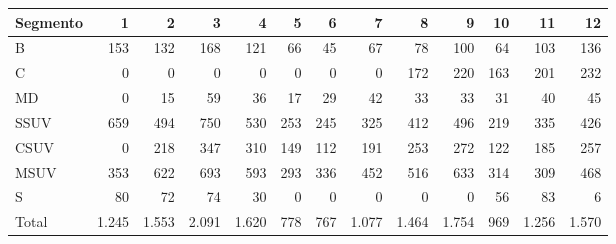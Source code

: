 \begin{tabular}{lrrrrrrrrrrrr}
\toprule
Segmento & 1 & 2 & 3 & 4 & 5 & 6 & 7 & 8 & 9 & 10 & 11 & 12 \\
\midrule
B & 153 & 132 & 168 & 121 & 66 & 45 & 67 & 78 & 100 & 64 & 103 & 136 \\
C & 0 & 0 & 0 & 0 & 0 & 0 & 0 & 172 & 220 & 163 & 201 & 232 \\
MD & 0 & 15 & 59 & 36 & 17 & 29 & 42 & 33 & 33 & 31 & 40 & 45 \\
SSUV & 659 & 494 & 750 & 530 & 253 & 245 & 325 & 412 & 496 & 219 & 335 & 426 \\
CSUV & 0 & 218 & 347 & 310 & 149 & 112 & 191 & 253 & 272 & 122 & 185 & 257 \\
MSUV & 353 & 622 & 693 & 593 & 293 & 336 & 452 & 516 & 633 & 314 & 309 & 468 \\
S & 80 & 72 & 74 & 30 & 0 & 0 & 0 & 0 & 0 & 56 & 83 & 6 \\
Total & 1.245 & 1.553 & 2.091 & 1.620 & 778 & 767 & 1.077 & 1.464 & 1.754 & 969 & 1.256 & 1.570 \\
\bottomrule
\end{tabular}
